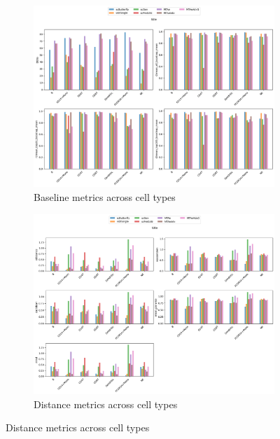\documentclass[12pt, a4paper]{article}
\begin{document}
\begin{figure}[h!]
    \centering
    \begin{subfigure}[t]{0.48\textwidth}
        \centering
        \includegraphics[width=\textwidth]{selected_benchmarking_cell_type_baseline_metrics_pbmc.png}
        \caption{Baseline metrics across cell types}
        \label{}
    \end{subfigure}
    \hfill
    \begin{subfigure}[t]{0.48\textwidth}
        \centering
        \includegraphics[width=\textwidth]{selected_benchmarking_cell_type_distance_metrics_pbmc.png}
        \caption{Distance metrics across cell types}
        \label{}
    \end{subfigure}

\end{figure}
\end{document}
